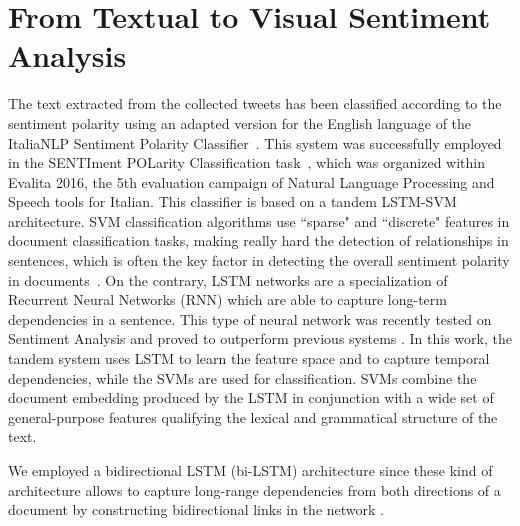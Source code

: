 \section{From Textual to Visual Sentiment Analysis}
\label{sec:vsa:method}
The text extracted from the collected tweets has been classified according to the sentiment polarity using an adapted version for the English language of the ItaliaNLP Sentiment Polarity Classifier~\cite{cimino2016tandem}.
This system was successfully employed in the SENTIment POLarity Classification task~\cite{barbieri2016overview}, which was organized within Evalita 2016, the 5th evaluation campaign of Natural Language Processing and Speech tools for Italian.
This classifier is based on a tandem LSTM-SVM architecture.
SVM classification algorithms use ``sparse" and ``discrete" features in document classification tasks, making really hard the detection of relationships in sentences, which is often the key factor in detecting the overall sentiment polarity in documents~\cite{tang2015document}.
On the contrary, LSTM networks are a specialization of Recurrent Neural Networks (RNN) which are able to capture long-term dependencies in a sentence. This type of neural network was recently tested on Sentiment Analysis and proved to outperform previous systems \cite{nakov2016semeval}.
In this work, the tandem system uses LSTM to  learn  the  feature  space and to  capture temporal dependencies, while the SVMs are used for classification.
SVMs combine the document embedding produced  by  the  LSTM  in conjunction with  a  wide  set of general-purpose features qualifying the lexical  and grammatical  structure  of  the text.

We  employed  a  bidirectional  LSTM (bi-LSTM) architecture since these kind of architecture allows to capture long-range dependencies from both directions
of a document by constructing bidirectional links in the network \cite{schuster1997bidirectional}.

